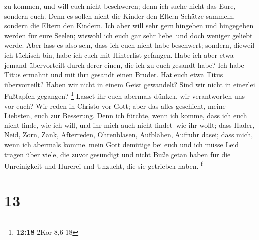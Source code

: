 zu kommen, und will euch nicht beschweren; denn ich suche nicht das
Eure, sondern euch. Denn es sollen nicht die Kinder den Eltern Schätze
sammeln, sondern die Eltern den Kindern.  Ich aber will
sehr gern hingeben und hingegeben werden für eure Seelen; wiewohl ich
euch gar sehr liebe, und doch weniger geliebt werde. 
Aber lass es also sein, dass ich euch nicht habe beschwert; sondern,
dieweil ich tückisch bin, habe ich euch mit Hinterlist gefangen.
 Habe ich aber etwa jemand übervorteilt durch derer
einen, die ich zu euch gesandt habe?  Ich habe Titus
ermahnt und mit ihm gesandt einen Bruder. Hat euch etwa Titus
übervorteilt? Haben wir nicht in einem Geist gewandelt? Sind wir nicht
in einerlei Fußtapfen gegangen? \footnote{\textbf{12:18} 2Kor 8,6-18}
 Lasset ihr euch abermals dünken, wir verantworten uns
vor euch? Wir reden in Christo vor Gott; aber das alles geschieht, meine
Liebsten, euch zur Besserung.  Denn ich fürchte, wenn ich
komme, dass ich euch nicht finde, wie ich will, und ihr mich auch nicht
findet, wie ihr wollt; dass Hader, Neid, Zorn, Zank, Afterreden,
Ohrenblasen, Aufblähen, Aufruhr dasei;  dass mich, wenn
ich abermals komme, mein Gott demütige bei euch und ich müsse Leid
tragen über viele, die zuvor gesündigt und nicht Buße getan haben für
die Unreinigkeit und Hurerei und Unzucht, die sie getrieben haben.
\textsuperscript{f}

\hypertarget{section-12}{%
\section{13}\label{section-12}}

